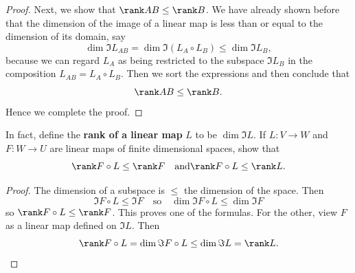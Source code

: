{{\begin{solution}
\begin{proof}
           Next, we show that $\rank AB \leq \rank B$. 
           We have already shown before that the dimension of the image of a linear map is less than or equal to the dimension of its domain, say  
           \begin{equation*}
                \dim \Im L_{AB} = \dim \Im (L_A \circ L_B) \leq \dim \Im L_B, 
           \end{equation*}
           because we can regard $L_A$ as being restricted to the subspace $\Im L_B$ in the composition $L_{AB} = L_A \circ L_B$. 
           Then we sort the expressions and then conclude that 
           \begin{equation*}
                \rank AB \leq \rank B. 
           \end{equation*}
           Hence we complete the proof. 
       \end{proof} 
   \end{solution}
   In fact, define the \textbf{rank of a linear map} $L$ to be $\dim \Im L$. 
   If $L: V \to W$ and $F: W \to U$ are linear maps of finite dimensional spaces, show that 
   \begin{equation*}
        \rank F \circ L \leq \rank F \quad \text{and} \rank F \circ L \leq \rank L. 
   \end{equation*}
   \begin{Solution}
        \begin{proof}
            The dimension of a subspace is $\leq$ the dimension of the space. 
            Then 
            \begin{equation*}
                \Im F \circ L \leq \Im F \quad \text{so} \quad \dim \Im F \circ L \leq \dim \Im F 
            \end{equation*}
            so $\rank F \circ L \leq \rank F$. 
            This proves one of the formulas. 
            For the other, view $F$ as a linear map defined on $\Im L$. 
            Then 
            \begin{equation*}
                \rank F \circ L = \dim \Im F \circ L \leq \dim \Im L = \rank L. 
            \end{equation*}
        \end{proof}
   \end{Solution}
   \item 
}}